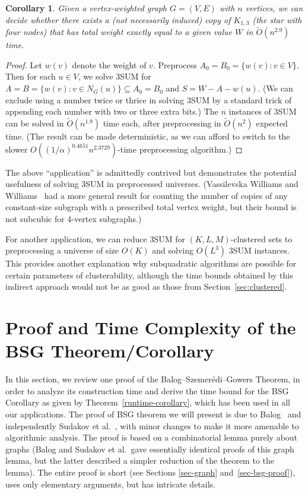 \documentclass[11pt]{article}
\newtheorem{corollary}[theorem]{Corollary}
\newcommand{\OO}{\widetilde{O}}
\begin{document}
{\begin{corollary}
Given a vertex-weighted graph $G=(V,E)$ with $n$ vertices, we can decide
whether there exists a (not necessarily induced) copy of
$K_{1,3}$ (the star with four nodes) that has total
weight exactly equal to a given value $W$ in $\OO(n^{2.9})$ time.
\end{corollary}
\begin{proof}
Let $w(v)$ denote the weight of $v$.
Preprocess $A_0=B_0=\{w(v): v\in V\}$.
Then for each $u\in V$, we solve 3SUM for
$A=B=\{w(v): v\in N_G(u)\}\subseteq A_0=B_0$ and $S=W-A-w(u)$.
(We can exclude using a number twice or thrice in solving 3SUM by
a standard trick of appending each number with two or three extra bits.)
The $n$ instances of 3SUM can be solved in $\OO(n^{1.9})$
time each, after preprocessing in $\OO(n^2)$ expected time.
(The result can be made deterministic, as we can
afford to switch to the slower
$O((1/\alpha)^{0.4651}n^{2.3729})$-time preprocessing algorithm.)
\end{proof}

The above ``application'' is admittedly contrived but demonstrates
the potential usefulness of solving 3SUM in preprocessed universes.
(Vassilevska Williams and Williams~\cite{VW09} had a more general
result for counting
the number of copies of any constant-size subgraph
with a prescribed total vertex weight, but their bound is not
subcubic for 4-vertex subgraphs.)

For another application, we can reduce 3SUM for $(K,L,M)$-clustered
sets to preprocessing a universe of size $O(K)$
and solving $O(L^3)$ 3SUM instances.  This provides another
explanation why subquadratic algorithms are possible for certain
parameters of clusterability, although the time bounds obtained by
this indirect approach would not be as good as those from Section~\ref{sec:clustered}.

\section{Proof and Time Complexity of the BSG Theorem/Corollary}\label{sec:Details}

\newcommand{\Deg}{\textrm{deg}}
\newcommand{\cdeg}{\textrm{cdeg}}
\newcommand{\BAD}{\textsc{bad}}
\newcommand{\Ex}{\mathbb{E}}

In this section, we review one proof of the
Balog--Szemer\'{e}di--Gowers Theorem, in order to analyze its
construction time and derive the time bound for the BSG Corollary as given by Theorem~\ref{runtime-corollary}, which has been
used in all our applications.
The proof of BSG theorem we will present is due to
Balog~\cite{Balog07} and independently
 Sudakov et al.~\cite{SSV94}, with minor changes
to make it more amenable to algorithmic analysis.  The proof is
based on a combinatorial lemma purely about graphs (Balog and
Sudakov et al.\ gave essentially identical proofs of this
graph lemma, but the latter described a simpler reduction of the
theorem to the lemma).  The entire proof is short (see Sections \ref{sec-graph} and~\ref{sec-bsg-proof}), uses only
elementary arguments, but has intricate details.

}
\end{document}
